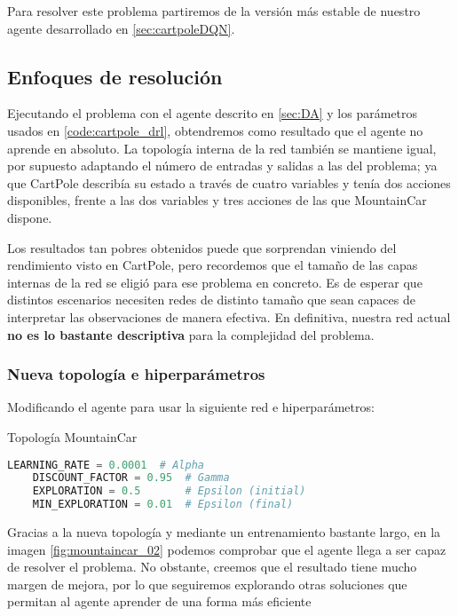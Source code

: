 Para resolver este problema partiremos de la versión más estable de nuestro agente desarrollado en \ref{sec:cartpoleDQN}.


\subsection{Enfoques de resolución}

Ejecutando el problema con el agente descrito en \ref{sec:DA} y los parámetros usados en \ref{code:cartpole_drl}, obtendremos como resultado que el agente no aprende en absoluto. La topología interna de la red también se mantiene igual, por supuesto adaptando el número de entradas y salidas a las del problema; ya que CartPole describía su estado a través de cuatro variables y tenía dos acciones disponibles, frente a las dos variables y tres acciones de las que MountainCar dispone.

Los resultados tan pobres obtenidos puede que sorprendan viniendo del rendimiento visto en CartPole, pero recordemos que el tamaño de las capas internas de la red se eligió para ese problema en concreto. Es de esperar que distintos escenarios necesiten redes de distinto tamaño que sean capaces de interpretar las observaciones de manera efectiva. En definitiva, nuestra red actual \textbf{no es lo bastante descriptiva} para la complejidad del problema.


\subsubsection{Nueva topología e hiperparámetros}

Modificando el agente para usar la siguiente red e hiperparámetros:

%
       {Topología MountainCar}

\begin{minipage}{0.9\linewidth}%
    \begin{lstlisting}[frame=tb, language=Python, caption=Hiperparámetros MountainCar, label=code:cartpole_drl]
    LEARNING_RATE = 0.0001  # Alpha
    DISCOUNT_FACTOR = 0.95  # Gamma
    EXPLORATION = 0.5       # Epsilon (initial)
    MIN_EXPLORATION = 0.01  # Epsilon (final)
    \end{lstlisting}%
\end{minipage}

Gracias a la nueva topología y mediante un entrenamiento bastante largo, en la imagen \ref{fig:mountaincar_02} podemos comprobar que el agente llega a ser capaz de resolver el problema. No obstante, creemos que el resultado tiene mucho margen de mejora, por lo que seguiremos explorando otras soluciones que permitan al agente aprender de una forma más eficiente

